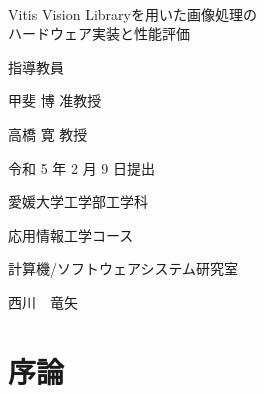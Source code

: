 \documentclass[11pt,a4j]{jreport}
\begin{document}
\thispagestyle{empty}
\begin{center}
\
\vspace{3cm}

{\huge{Vitis Vision Libraryを用いた画像処理の\\
ハードウェア実装と性能評価}}

\vspace{12mm}

{\LARGE 指導教員}

\vspace{6mm}

{\LARGE 甲斐 博 准教授}

\vspace{5mm}

{\LARGE 高橋 寛 教授}

\vspace{20mm}

{\LARGE 令和 5 年 2 月 9 日提出}\\

\vspace{20mm}

{\LARGE 愛媛大学工学部工学科}\\

\vspace{4mm}

{\LARGE 応用情報工学コース}\\

\vspace{4mm}

{\LARGE 計算機/ソフトウェアシステム研究室}\\

\vspace{18mm}

{\huge 西川　竜矢}\\

\end{center}

\thispagestyle{empty}
\clearpage

\tableofcontents

\pagestyle{fancy}
\lhead{\rightmark}
\renewcommand{\chaptermark}[1]{\markboth{第\ \normalfont\thechapter\ 章~~#1}{}}
%
\chapter{序論} %
\end{document}
